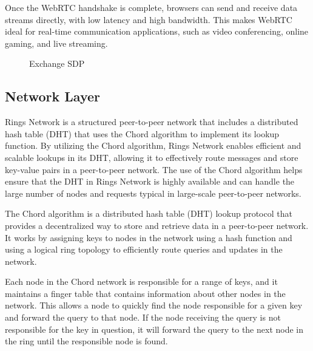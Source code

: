 \documentclass[twocolumn]{article}
\begin{document}
Once the WebRTC handshake is complete, browsers can send and receive data streams directly, with low latency and high bandwidth. This makes WebRTC ideal for real-time communication applications, such as video conferencing, online gaming, and live streaming.


\begin{figure}[htbp]

\caption{Exchange SDP}
\end{figure}

\subsection{Network Layer}
Rings Network is a structured peer-to-peer network that includes a distributed hash table (DHT) that uses the Chord algorithm to implement its lookup function. By utilizing the Chord algorithm, Rings Network enables efficient and scalable lookups in its DHT, allowing it to effectively route messages and store key-value pairs in a peer-to-peer network. The use of the Chord algorithm helps ensure that the DHT in Rings Network is highly available and can handle the large number of nodes and requests typical in large-scale peer-to-peer networks.

The Chord algorithm is a distributed hash table (DHT) lookup protocol that provides a decentralized way to store and retrieve data in a peer-to-peer network. It works by assigning keys to nodes in the network using a hash function and using a logical ring topology to efficiently route queries and updates in the network.

Each node in the Chord network is responsible for a range of keys, and it maintains a finger table that contains information about other nodes in the network. This allows a node to quickly find the node responsible for a given key and forward the query to that node. If the node receiving the query is not responsible for the key in question, it will forward the query to the next node in the ring until the responsible node is found.
\end{document}
